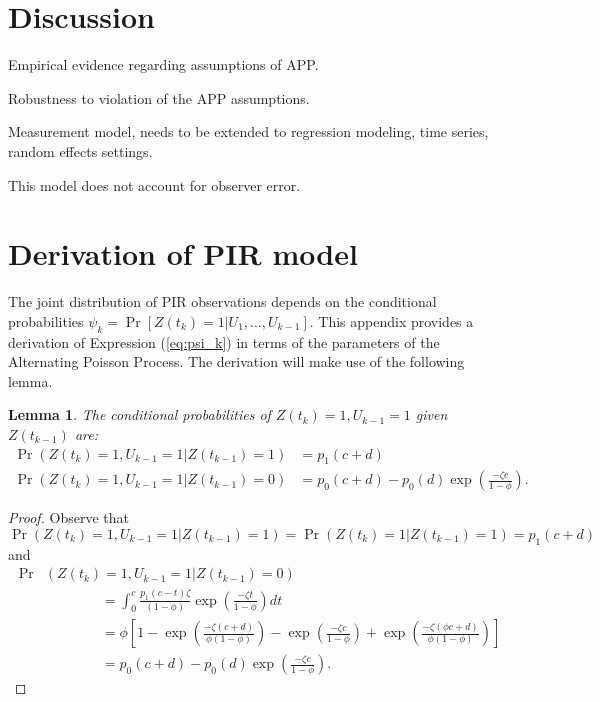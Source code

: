 \documentclass[man, noextraspace, floatsintext]{apa6}\usepackage[]{graphicx}\usepackage[]{color}
\newcommand{\bibfile}{C:/Users/jep2963/Documents/Bibliography/Behavioral_observation-APP}
\newtheorem{lemma}{Lemma}
\begin{document}
\section{Discussion}
\label{sec:discussion}

Empirical evidence regarding assumptions of APP. 

Robustness to violation of the APP assumptions.

Measurement model, needs to be extended to regression modeling, time series, random effects settings.

This model does not account for observer error.



 
\appendix

\section{Derivation of PIR model}
\label{app:PIR_derivation}

The joint distribution of PIR observations depends on the conditional probabilities $\psi_k = \Pr\left[ Z(t_k) = 1 \left| U_1,...,U_{k-1}\right.\right]$. 
This appendix provides a derivation of Expression (\ref{eq:psi_k}) in terms of the parameters of the Alternating Poisson Process. The derivation will make use of the following lemma.

\begin{lemma}
\label{lemma1}
The conditional probabilities of $Z(t_k) = 1, U_{k-1} = 1$ given $Z(t_{k-1})$ are:
\begin{align*}
\Pr\left(Z(t_k) = 1, U_{k-1} = 1 \left| Z(t_{k-1}) = 1 \right.\right) &= p_1(c + d) \\
\Pr\left(Z(t_k) = 1, U_{k-1} = 1 \left| Z(t_{k-1}) = 0 \right.\right) &= p_0(c + d) - p_0(d) \exp\left(\frac{- \zeta c}{1 - \phi}\right).
\end{align*}
\end{lemma}

\begin{proof}
Observe that \[
\Pr\left(Z(t_k) = 1, U_{k-1} = 1 \left| Z(t_{k-1}) = 1 \right.\right) = \Pr\left(Z(t_k) = 1 \left| Z(t_{k-1}) = 1 \right.\right) = p_1(c + d) \]
and \begin{align*}
\Pr &\left(Z(t_k) = 1, U_{k-1} = 1 \left| Z(t_{k-1}) = 0 \right.\right) \\
& \qquad \qquad = \int_0^c\frac{p_1(c - t) \zeta}{(1 - \phi)}\exp\left(\frac{-\zeta t}{1 - \phi}\right) dt \\
& \qquad \qquad  = \phi \left[ 1 - \exp\left(\frac{- \zeta (c + d)}{\phi(1 - \phi)}\right) - \exp\left(\frac{- \zeta c}{1 - \phi}\right) + \exp\left(\frac{- \zeta (\phi c + d)}{\phi(1 - \phi)}\right)\right] \\
& \qquad \qquad = p_0(c + d) - p_0(d) \exp\left(\frac{- \zeta c}{1 - \phi}\right).
\end{align*}
\end{proof}
\end{document}
